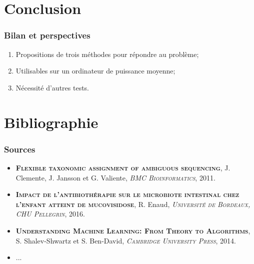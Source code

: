 \documentclass{beamer}
\begin{document}
\section{Conclusion}

\begin{frame}
\tableofcontents[currentsection]
\end{frame}

\begin{frame}
\frametitle{Bilan et perspectives}

\begin{enumerate}
\item Propositions de trois méthodes pour répondre au problème;
\bigskip
\pause
\item Utilisables sur un ordinateur de puissance moyenne;
\bigskip
\pause
\item Nécessité d'autres tests.
\end{enumerate}

\end{frame}

\section{Bibliographie}
\begin{frame}
\frametitle{Sources}

\begin{itemize}
\item \textsc{ \bf Flexible taxonomic assignment of ambiguous sequencing}, J. Clemente, J. Jansson et G. Valiente, \textsc{ \it BMC Bioinformatics}, 2011.
\item \textsc{\bf Impact de l'antibiothérapie sur le microbiote intestinal chez l'enfant atteint de mucovisidose}, R. Enaud, \textsc{\it Université de Bordeaux, CHU Pellegrin}, 2016.
\item \textsc{\bf Understanding Machine Learning: From Theory to Algorithms}, S. Shalev-Shwartz et S. Ben-David, \textsc{\it Cambridge University Press}, 2014.
\item ...
\end{itemize}

\end{frame}
\end{document}
